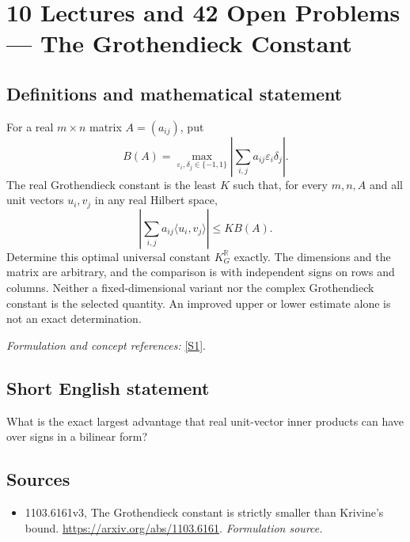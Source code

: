 \documentclass[11pt]{article}
\begin{document}
\section*{\texorpdfstring{10 Lectures and 42 Open Problems — The Grothendieck Constant}{10 Lectures and 42 Open Problems — The Grothendieck Constant}}\label{statement}
\subsection{Definitions and mathematical statement}
For a real $m\times n$ matrix $A=(a_{ij})$, put
\[
 B(A)=\max_{{\varepsilon}_i,\delta_j\in\{-1,1\}}
 \left|\sum_{i,j}a_{ij}{\varepsilon}_i\delta_j\right|.
\]
The real Grothendieck constant is the least $K$ such that, for every $m,n,A$ and all unit vectors $u_i,v_j$ in any real Hilbert space,
\[
 \left|\sum_{i,j}a_{ij}\langle u_i,v_j\rangle\right|\le K B(A).
\]
Determine this optimal universal constant $K_G^{{\mathbb{R}}}$ exactly. The dimensions and the matrix are arbitrary, and the comparison is with independent signs on rows and columns. Neither a fixed-dimensional variant nor the complex Grothendieck constant is the selected quantity. An improved upper or lower estimate alone is not an exact determination.
\par\smallskip\textit{Formulation and concept references:} \href{https://arxiv.org/abs/1103.6161}{[S1]}.

\subsection{Short English statement}
What is the exact largest advantage that real unit-vector inner products can have over signs in a bilinear form?
\subsection{Sources}
\begin{itemize}
\item[S1]1103.6161v3, The Grothendieck constant is strictly smaller than Krivine's bound.
\url{https://arxiv.org/abs/1103.6161}.
\textit{Formulation source.}
\end{itemize}
\end{document}

